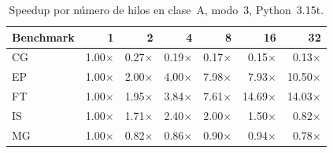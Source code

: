 \begin{table}[htbp]
\centering
\small
\begin{tabular}{lrrrrrr}
\hline
Benchmark & 1 & 2 & 4 & 8 & 16 & 32 \\
\hline
CG & 1.00$\times$ & 0.27$\times$ & 0.19$\times$ & 0.17$\times$ & 0.15$\times$ & 0.13$\times$ \\
EP & 1.00$\times$ & 2.00$\times$ & 4.00$\times$ & 7.98$\times$ & 7.93$\times$ & 10.50$\times$ \\
FT & 1.00$\times$ & 1.95$\times$ & 3.84$\times$ & 7.61$\times$ & 14.69$\times$ & 14.03$\times$ \\
IS & 1.00$\times$ & 1.71$\times$ & 2.40$\times$ & 2.00$\times$ & 1.50$\times$ & 0.82$\times$ \\
MG & 1.00$\times$ & 0.82$\times$ & 0.86$\times$ & 0.90$\times$ & 0.94$\times$ & 0.78$\times$ \\
\hline
\end{tabular}
\caption{Speedup por número de hilos en clase~A, modo~3, Python~3.15t.}
\label{tab:resultados-a-mode3-speedups}
\end{table}
